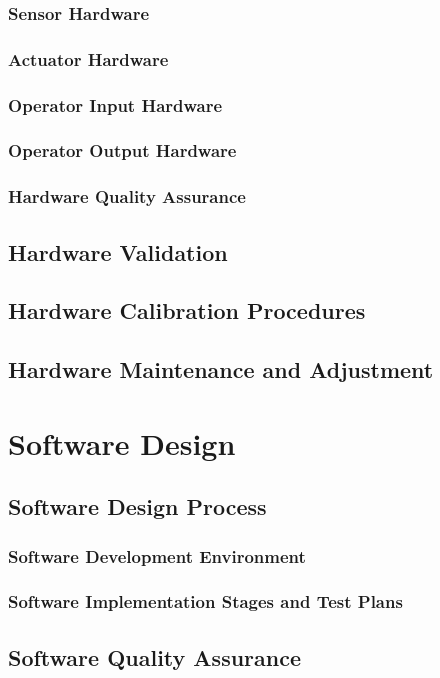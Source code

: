 \documentclass[10pt,a4paper]{report}
\begin{document}
\subsection{Sensor Hardware}
\subsection{Actuator Hardware}
\subsection{Operator Input Hardware}
\subsection{Operator Output Hardware}
\subsection{Hardware Quality Assurance}

\section{Hardware Validation}

\section{Hardware Calibration Procedures}

\section{Hardware Maintenance and Adjustment}

\chapter{Software Design}
\section{Software Design Process}
\subsection{Software Development Environment}
\subsection{Software Implementation Stages and Test Plans}

\section{Software Quality Assurance}
\end{document}
